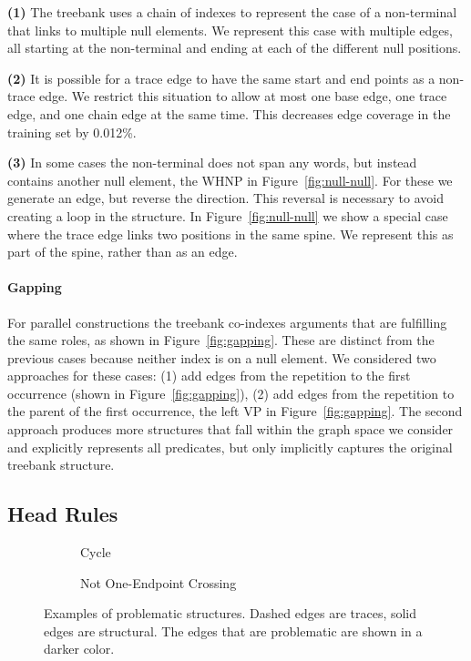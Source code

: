 \textbf{(1)}
The treebank uses a chain of indexes to represent the case of a non-terminal that links to multiple null elements.
We represent this case with multiple edges, all starting at the non-terminal and ending at each of the different null positions.

\textbf{(2)}
It is possible for a trace edge to have the same start and end points as a non-trace edge.
We restrict this situation to allow at most one base edge, one trace edge, and one chain edge at the same time.
This decreases edge coverage in the training set by 0.012\%.

\textbf{(3)}
In some cases the non-terminal does not span any words, but instead contains another null element, \myeg the WHNP in Figure~\ref{fig:null-null}.
For these we generate an edge, but reverse the direction.
This reversal is necessary to avoid creating a loop in the structure.
In Figure~\ref{fig:null-null} we show a special case where the trace edge links two positions in the same spine.
We represent this as part of the spine, rather than as an edge.

\paragraph{Gapping}
For parallel constructions the treebank co-indexes arguments that are fulfilling the same roles, as shown in Figure~\ref{fig:gapping}.
These are distinct from the previous cases because neither index is on a null element.
We considered two approaches for these cases: (1) add edges from the repetition to the first occurrence (shown in Figure~\ref{fig:gapping}), (2) add edges from the repetition to the parent of the first occurrence, \myeg the left VP in Figure~\ref{fig:gapping}.
The second approach produces more structures that fall within the graph space we consider and explicitly represents all predicates, but only implicitly captures the original treebank structure.

\subsection{Head Rules} \label{sec:rep-head}

\begin{figure}
\begin{subfigure}[b]{0.32\textwidth}
  \centering
  \scalebox{0.9}{}
  \caption{\label{fig:cycle}
    Cycle
  }
\end{subfigure}
\hfill
\begin{subfigure}[b]{0.58\textwidth}
  \centering
  \scalebox{0.9}{}
  \caption{\label{fig:not-1ec}
    Not One-Endpoint Crossing
  }
\end{subfigure}
\caption[Examples of problematic graph structured syntactic phenomena.]{
Examples of problematic structures.
Dashed edges are traces, solid edges are structural.
The edges that are problematic are shown in a darker color.
}
\end{figure}

